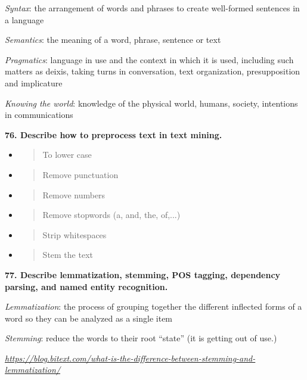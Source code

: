 \textit{Syntax}: the arrangement of words and phrases to create
well-formed sentences in a language

\textit{Semantics}: the meaning of a word, phrase, sentence or text

\textit{Pragmatics}: language in use and the context in which it is
used, including such matters as deixis, taking turns in conversation,
text organization, presupposition and implicature

\textit{Knowing the world}: knowledge of the physical world, humans,
society, intentions in communications

\textbf{76. Describe how to preprocess text in text mining.}

\begin{itemize}
\item
  \begin{quote}
  To lower case
  \end{quote}
\item
  \begin{quote}
  Remove punctuation
  \end{quote}
\item
  \begin{quote}
  Remove numbers
  \end{quote}
\item
  \begin{quote}
  Remove stopwords (a, and, the, of,...)
  \end{quote}
\item
  \begin{quote}
  Strip whitespaces
  \end{quote}
\item
  \begin{quote}
  Stem the text
  \end{quote}
\end{itemize}

\textbf{77. Describe lemmatization, stemming, POS tagging, dependency
parsing, and named entity recognition.}

\textit{Lemmatization}: the process of grouping together the
different inflected forms of a word so they can be analyzed as a single
item

\textit{Stemming}: reduce the words to their root ``state'' (it is
getting out of use.)

\href{https://blog.bitext.com/what-is-the-difference-between-stemming-and-lemmatization/}{\textit{https://blog.bitext.com/what-is-the-difference-between-stemming-and-lemmatization/}}

